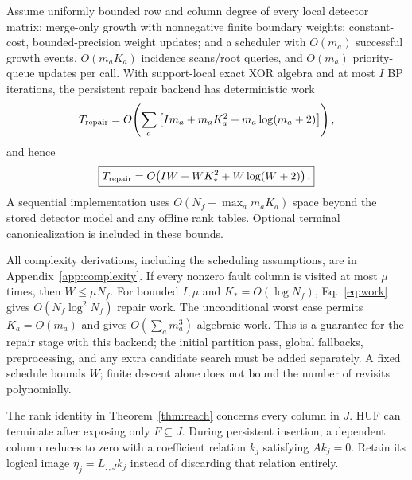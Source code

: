 \begin{theorem}\label{thm:work}
Assume uniformly bounded row and column degree of every local detector matrix; merge-only growth with nonnegative finite boundary weights; constant-cost, bounded-precision weight updates; and a scheduler with $O(m_a)$ successful growth events, $O(m_aK_a)$ incidence scans/root queries, and $O(m_a)$ priority-queue updates per call. With support-local exact XOR algebra and at most $I$ BP iterations, the persistent repair backend has deterministic work
\begin{equation}
T_{\rm repair}=O\!\left(\sum_a\left[Im_a+m_aK_a^2+m_a\log(m_a+2)\right]\right),\label{eq:workexact}
\end{equation}
and hence
\begin{equation}\boxed{T_{\rm repair}=O\!\left(IW+WK_*^2+W\log(W+2)\right).}\label{eq:work}
\end{equation}
A sequential implementation uses $O(N_f+\max_a m_aK_a)$ space beyond the stored detector model and any offline rank tables. Optional terminal canonicalization is included in these bounds.
\end{theorem}
All complexity derivations, including the scheduling assumptions, are in Appendix~\ref{app:complexity}. If every nonzero fault column is visited at most $\mu$ times, then $W\le\mu N_f$. For bounded $I,\mu$ and $K_*=O(\log N_f)$, Eq.~\eqref{eq:work} gives $O(N_f\log^2N_f)$ repair work. The unconditional worst case permits $K_a=O(m_a)$ and gives $O(\sum_a m_a^3)$ algebraic work. This is a guarantee for the repair stage with this backend; the initial partition pass, global fallbacks, preprocessing, and any extra candidate search must be added separately. A fixed schedule bounds $W$; finite descent alone does not bound the number of revisits polynomially.

The rank identity in Theorem~\ref{thm:reach} concerns every column in $J$. HUF can terminate after exposing only $F\subseteq J$. During persistent insertion, a dependent column reduces to zero with a coefficient relation $k_j$ satisfying $A k_j=0$. Retain its logical image $\eta_j=L_{:,J}k_j$ instead of discarding that relation entirely.

